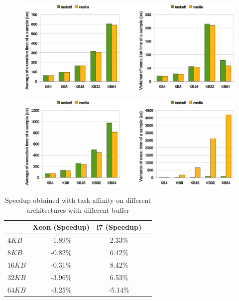 \begin{figure}[htbp]
\centering
\includegraphics[width=\widefigure]{images/time/time_avg_var_Xeon.eps}
\caption{}
\label{fig:avg_var_xeon}
\end{figure}

\newpage

\begin{figure}[htbp]
\centering
\includegraphics[width=\widefigure]{images/time/time_avg_var_i7.eps}
\caption{}
\label{fig:avg_var_i7}
\end{figure}

\begin{table}[htbp]
\begin{center}
\begin{tabular}{l|c|c|c}
	\hline
	& Xeon (Speedup) & i7 (Speedup) \\ \hline
	$4KB$  & -1.89\% & 2.33\% \\ \hline
	$8KB$  & -0.82\% & 6.42\% \\ \hline
	$16KB$ & -0.31\% & 8.42\% \\ \hline
	$32KB$ & -3.96\% & 6.53\% \\ \hline
	$64KB$ & -3.25\% & -5.14\% \\ \hline
\end{tabular}
\caption{Speedup obtained with task-affinity on different architectures with different buffer}
\label{tab:speedup_xeon_i7}
\end{center}
\end{table}

